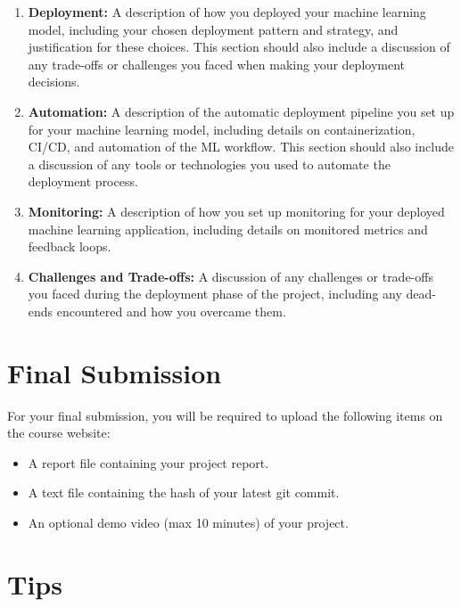 \documentclass[a4paper]{article}
\begin{document}
	\begin{enumerate}
	\item \textbf{Deployment:} A description of how you deployed your machine learning model, including your chosen deployment pattern and strategy, and justification for these choices. This section should also include a discussion of any trade-offs or challenges you faced when making your deployment decisions.
	\item \textbf{Automation:} A description of the automatic deployment pipeline you set up for your machine learning model, including details on containerization, CI/CD, and automation of the ML workflow. This section should also include a discussion of any tools or technologies you used to automate the deployment process.
	\item \textbf{Monitoring:} A description of how you set up monitoring for your deployed machine learning application, including details on monitored metrics and feedback loops.
	\item \textbf{Challenges and Trade-offs:} A discussion of any challenges or trade-offs you faced during the deployment phase of the project, including any dead-ends encountered and how you overcame them.
	\end{enumerate}



	\section{Final Submission}
For your final submission, you will be required to upload the following items on the course website:
	\begin{itemize}
	\item A report file containing your project report.
	\item A text file containing the hash of your latest git commit.
	\item An optional demo video (max 10 minutes) of your project.
	\end{itemize}



	\section{Tips}
	
\end{document}
